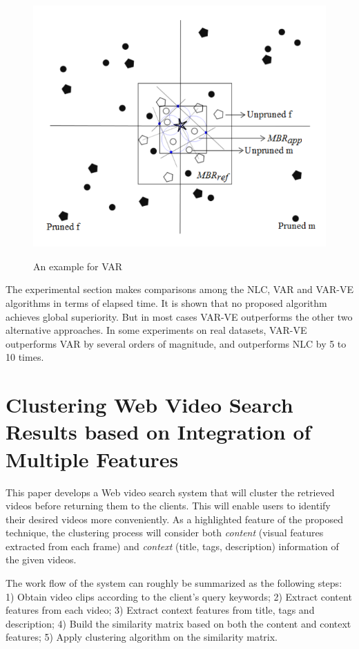 \documentclass[paper=a4, fontsize=18pt]{article} %
\numberwithin{equation}{section} %
\numberwithin{figure}{section} %
\numberwithin{table}{section} %
\begin{document}
\begin{figure}[h]
  \centering
  \includegraphics[width=.6\linewidth]{74_var.png}\\
  \caption{An example for VAR}\label{fig:var}
\end{figure}


The experimental section makes comparisons among the NLC, VAR and VAR-VE algorithms in terms of elapsed time. It is shown that no proposed algorithm achieves global superiority. But in most cases VAR-VE outperforms the other two alternative approaches. In some experiments on real datasets, VAR-VE outperforms VAR by several orders of magnitude, and outperforms NLC by 5 to 10 times.


\section{Clustering Web Video Search Results based on Integration of Multiple Features \cite{HSLLZ11}}

This paper develops a Web video search system that will cluster the retrieved videos before returning them to the clients. This will enable users to identify their desired videos more conveniently. As a highlighted feature of the proposed technique, the clustering process will consider both \emph{content} (visual features extracted from each frame) and \emph{context} (title, tags, description) information of the given videos.

The work flow of the system can roughly be summarized as the following steps: 1) Obtain video clips according to the client's query keywords; 2) Extract content features from each video; 3) Extract context features from title, tags and description; 4) Build the similarity matrix based on both the content and context features; 5) Apply clustering algorithm on the similarity matrix.
\end{document}
